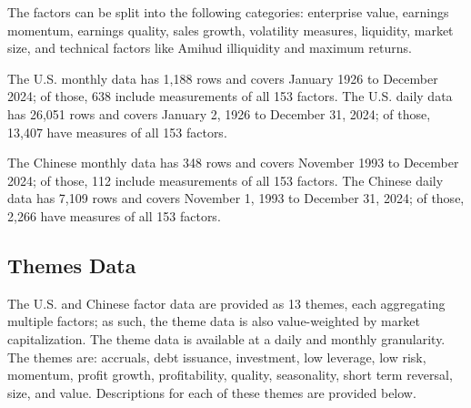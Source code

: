 The factors can be split into the following categories: enterprise value, earnings momentum, earnings quality, sales growth, volatility measures, liquidity, market size, and technical factors like Amihud illiquidity and maximum returns. 

The U.S. monthly data has 1,188 rows and covers January 1926 to December 2024; of those, 638 include measurements of all 153 factors. The U.S. daily data has 26,051 rows and covers January 2, 1926 to December 31, 2024; of those, 13,407 have measures of all 153 factors.

The Chinese monthly data has 348 rows and covers November 1993 to December 2024; of those, 112 include measurements of all 153 factors. The Chinese daily data has 7,109 rows and covers November 1, 1993 to December 31, 2024; of those, 2,266 have measures of all 153 factors.

\subsection{Themes Data}

The U.S. and Chinese factor data are provided as 13 themes, each aggregating multiple factors; as such, the theme data is also value-weighted by market capitalization. The theme data is available at a daily and monthly granularity. The themes are: accruals, debt issuance, investment, low leverage, low risk, momentum, profit growth, profitability, quality, seasonality, short term reversal, size, and value. Descriptions for each of these themes are provided below.


